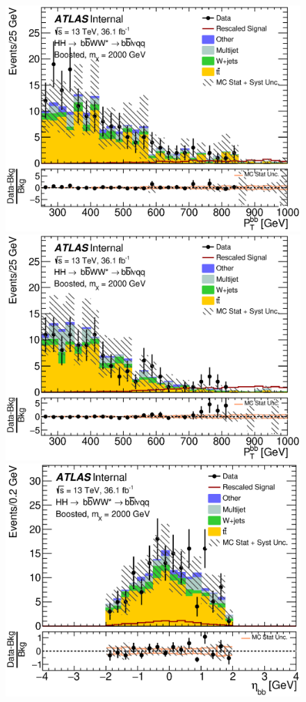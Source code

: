 \begin{figure}[h]
\begin{center}
\includegraphics[scale=0.33]{figures/kinplots/new/C_2tag_SR_elec_presel_met50_HbbPt}
\includegraphics[scale=0.33]{figures/kinplots/new/C_2tag_SR_muon_presel_met50_HbbPt}\\
\includegraphics[scale=0.33]{figures/kinplots/new/C_2tag_SR_elec_presel_met50_HbbEta}

\end{center}
\end{figure}
